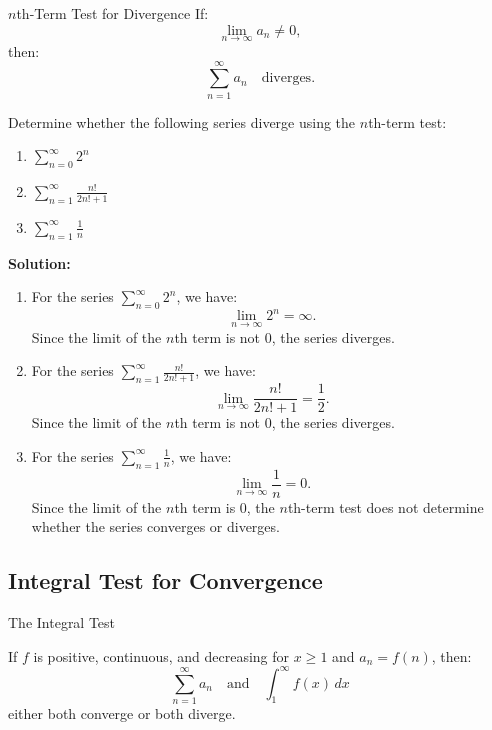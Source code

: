 \documentclass[12pt]{article}
\theoremstyle{beautifulthm}
\begin{document}
\begin{mytheorem}{$n$th-Term Test for Divergence}{}
    If:
\[
\lim_{n \to \infty} a_n \neq 0,
\]
then:
\[
\sum_{n=1}^\infty a_n \quad \text{diverges}.
\]

\end{mytheorem}

\begin{tcolorbox}[colback=examplebg, colframe=red!75!black, title=\textbf{EXAMPLE 1: Using the $n$th-Term Test for Divergence}, fonttitle=\bfseries, sharp corners]
Determine whether the following series diverge using the $n$th-term test:
\begin{enumerate}
    \item $\sum_{n=0}^\infty 2^n$
    \item $\sum_{n=1}^\infty \frac{n!}{2n! + 1}$
    \item $\sum_{n=1}^\infty \frac{1}{n}$
\end{enumerate}


\tcblower
\textbf{Solution:} 
\begin{enumerate}
    \item For the series $\sum_{n=0}^\infty 2^n$, we have:
    \[
    \lim_{n \to \infty} 2^n = \infty.
    \]
    Since the limit of the $n$th term is not $0$, the series diverges.

    \item For the series $\sum_{n=1}^\infty \frac{n!}{2n! + 1}$, we have:
    \[
    \lim_{n \to \infty} \frac{n!}{2n! + 1} = \frac{1}{2}.
    \]
    Since the limit of the $n$th term is not $0$, the series diverges.

    \item For the series $\sum_{n=1}^\infty \frac{1}{n}$, we have:
    \[
    \lim_{n \to \infty} \frac{1}{n} = 0.
    \]
    Since the limit of the $n$th term is $0$, the $n$th-term test does not determine whether the series converges or diverges. 
\end{enumerate}
\end{tcolorbox}


\subsection{Integral Test for
Convergence}
\begin{mytheorem}{The Integral Test}{}

If $f$ is positive, continuous, and decreasing for $x \geq 1$ and $a_n = f(n)$, then:
\[
\sum_{n=1}^\infty a_n \quad \text{and} \quad \int_1^\infty f(x) \, dx
\]
either both converge or both diverge.
    
\end{mytheorem}
\end{document}
